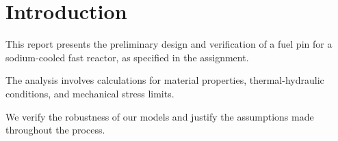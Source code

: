 
\section{Introduction}
This report presents the preliminary design and verification of a fuel pin for a sodium-cooled fast reactor, as specified in the assignment.

The analysis involves calculations for material properties, thermal-hydraulic conditions, and mechanical stress limits.

We verify the robustness of our models and justify the assumptions made throughout the process.
